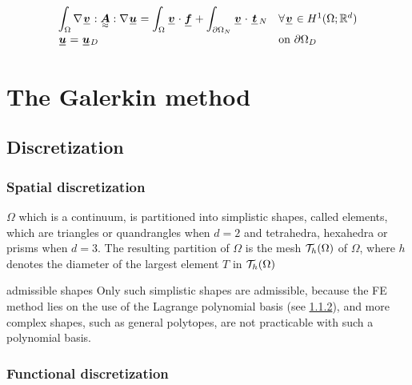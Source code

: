 \documentclass[fleqn]{article}
\begin{document}
        \begin{equation}
          \begin{array}{ll}
            \displaystyle
            \int_{\Omega} \nabla \tensori{v} : \tensoriv{A} : \nabla \tensori{u} = \int_{\Omega} \tensori{v} \cdot \tensori{f} + \int_{\partial \Omega_N} \tensori{v} \cdot \tensori{t}\subscript{N} & \forall \tensori{v} \in \Hone
            \\
            \tensori{u} = \tensori{u} \subscript{D} & \mbox{on $\partial \Omega_D$}
          \end{array}
          \label{eq_weak_problem}
        \end{equation}
  
  \newpage

  \section{The Galerkin method}

    \subsection{Discretization}
      

      \subsubsection{Spatial discretization}
      
        $\Omega$ which is a continuum, is partitioned into simplistic shapes, called elements, which are triangles or
        quandrangles when $d = 2$ and tetrahedra, hexahedra or prisms when $d = 3$.
        The resulting partition of $\Omega$ is the mesh $\mathcal{T}_h(\Omega)$ of $\Omega$, where $h$ denotes the diameter of
        the largest element $T$ in $\mathcal{T}_h(\Omega)$

        \begin{infobox}{admissible shapes}
          Only such simplistic shapes are admissible, because the FE method lies on the use of the Lagrange polynomial basis (see \ref{sec_functional_discretization}), and more complex shapes, such as general polytopes, are not practicable with such a polynomial basis.
        \end{infobox}

      \subsubsection{Functional discretization}
      \label{sec_functional_discretization}
        
\end{document}
